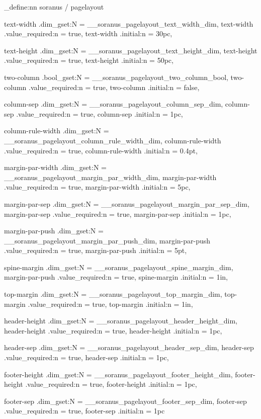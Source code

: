 \keys_define:nn { soranus / pagelayout }
  {
    text-width        .dim_gset:N       = \g__soranus_pagelayout_text_width_dim,
    text-width        .value_required:n = true,
    text-width        .initial:n        = 30pc,

    text-height       .dim_gset:N       = \g__soranus_pagelayout_text_height_dim,
    text-height       .value_required:n = true,
    text-height       .initial:n        = 50pc,

    two-column        .bool_gset:N      = \g__soranus_pagelayout_two_column_bool,
    two-column        .value_required:n = true,
    two-column        .initial:n        = false,

    column-sep        .dim_gset:N       = \g__soranus_pagelayout_column_sep_dim,
    column-sep        .value_required:n = true,
    column-sep        .initial:n        = 1pc,

    column-rule-width .dim_gset:N       = \g__soranus_pagelayout_column_rule_width_dim,
    column-rule-width .value_required:n = true,
    column-rule-width .initial:n        = 0.4pt,

    margin-par-width  .dim_gset:N       = \g__soranus_pagelayout_margin_par_width_dim,
    margin-par-width  .value_required:n = true,
    margin-par-width  .initial:n        = 5pc,

    margin-par-sep    .dim_gset:N       = \g__soranus_pagelayout_margin_par_sep_dim,
    margin-par-sep    .value_required:n = true,
    margin-par-sep    .initial:n        = 1pc,

    margin-par-push   .dim_gset:N       = \g__soranus_pagelayout_margin_par_push_dim,
    margin-par-push   .value_required:n = true,
    margin-par-push   .initial:n        = 5pt,

    spine-margin      .dim_gset:N       = \g__soranus_pagelayout_spine_margin_dim,
    margin-par-push   .value_required:n = true,
    spine-margin      .initial:n        = 1in,

    top-margin        .dim_gset:N       = \g__soranus_pagelayout_top_margin_dim,
    top-margin        .value_required:n = true,
    top-margin        .initial:n        = 1in,

    header-height     .dim_gset:N       = \g__soranus_pagelayout_header_height_dim,
    header-height     .value_required:n = true,
    header-height     .initial:n        = 1pc,

    header-sep        .dim_gset:N       = \g__soranus_pagelayout_header_sep_dim,
    header-sep        .value_required:n = true,
    header-sep        .initial:n        = 1pc,

    footer-height     .dim_gset:N       = \g__soranus_pagelayout_footer_height_dim,
    footer-height     .value_required:n = true,
    footer-height     .initial:n        = 1pc,

    footer-sep        .dim_gset:N       = \g__soranus_pagelayout_footer_sep_dim,
    footer-sep        .value_required:n = true,
    footer-sep        .initial:n        = 1pc
  }


